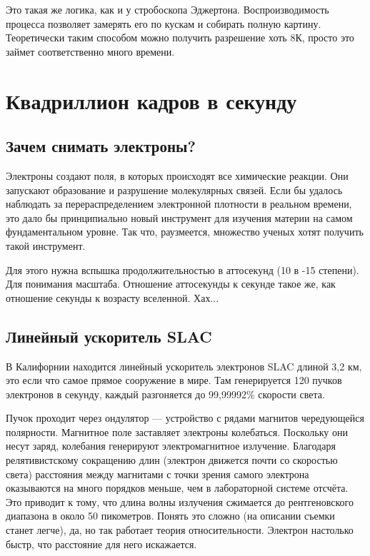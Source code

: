 \documentclass[a4paper, 11pt]{extarticle}
\newcommand{\percent}{\% }
\begin{document}
Это такая же логика, как и у стробоскопа Эджертона. Воспроизводимость процесса позволяет замерять его по кускам и собирать полную картину. Теоретически таким способом можно получить разрешение хоть 8К, просто это займет соответственно много времени. 

\section{Квадриллион кадров в секунду}

\subsection{Зачем снимать электроны?}

Электроны создают поля, в которых происходят все химические реакции. Они запускают образование и разрушение молекулярных связей. Если бы удалось наблюдать за перераспределением электронной плотности в реальном времени, это дало бы принципиально новый инструмент для изучения материи на самом фундаментальном уровне. Так что, раузмеется, множество ученых хотят получить такой инструмент.

Для этого нужна вспышка продолжительностью в аттосекунд (10 в -15 степени). Для понимания масштаба. Отношение аттосекунды к секунде такое же, как отношение секунды к возрасту вселенной. Хах...

\subsection{Линейный ускоритель SLAC}

В Калифорнии находится линейный ускоритель электронов SLAC длиной 3,2 км, это если что самое прямое сооружение в мире. Там генерируется 120 пучков электронов в секунду, каждый разгоняется до 99,99992\percent скорости света.

Пучок проходит через ондулятор — устройство с рядами магнитов чередующейся полярности. Магнитное поле заставляет электроны колебаться. Поскольку они несут заряд, колебания генерируют электромагнитное излучение. Благодаря релятивистскому сокращению длин (электрон движется почти со скоростью света) расстояния между магнитами с точки зрения самого электрона оказываются на много порядков меньше, чем в лабораторной системе отсчёта. Это приводит к тому, что длина волны излучения сжимается до рентгеновского диапазона в около 50 пикометров. Понять это сложно (на описании съемки станет легче), да, но так работает теория относительности. Электрон настолько быстр, что расстояние для него искажается. 
\end{document}
